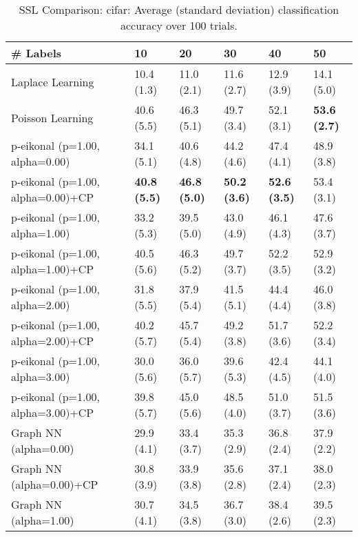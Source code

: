 \documentclass{article}
\begin{document}
\begin{table*}[t!]
\vspace{-3mm}
\caption{SSL Comparison: cifar: Average (standard deviation) classification accuracy over 100 trials.}
\vspace{-3mm}
\label{tab:SSL Comparison: cifar}
\vskip 0.15in
\begin{center}
\begin{small}
\begin{sc}
\begin{tabular}{llllll}
\toprule
\# Labels&\textbf{10}&\textbf{20}&\textbf{30}&\textbf{40}&\textbf{50}\\
\midrule
Laplace Learning&10.4 (1.3)      &11.0 (2.1)      &11.6 (2.7)      &12.9 (3.9)      &14.1 (5.0)      \\
Poisson Learning&40.6 (5.5)      &46.3 (5.1)      &49.7 (3.4)      &52.1 (3.1)      &{\bf 53.6 (2.7)}\\
p-eikonal (p=1.00, alpha=0.00)&34.1 (5.1)      &40.6 (4.8)      &44.2 (4.6)      &47.4 (4.1)      &48.9 (3.8)      \\
p-eikonal (p=1.00, alpha=0.00)+CP&{\bf 40.8 (5.5)}&{\bf 46.8 (5.0)}&{\bf 50.2 (3.6)}&{\bf 52.6 (3.5)}&53.4 (3.1)      \\
p-eikonal (p=1.00, alpha=1.00)&33.2 (5.3)      &39.5 (5.0)      &43.0 (4.9)      &46.1 (4.3)      &47.6 (3.7)      \\
p-eikonal (p=1.00, alpha=1.00)+CP&40.5 (5.6)      &46.3 (5.2)      &49.7 (3.7)      &52.2 (3.5)      &52.9 (3.2)      \\
p-eikonal (p=1.00, alpha=2.00)&31.8 (5.5)      &37.9 (5.4)      &41.5 (5.1)      &44.4 (4.4)      &46.0 (3.8)      \\
p-eikonal (p=1.00, alpha=2.00)+CP&40.2 (5.7)      &45.7 (5.4)      &49.2 (3.8)      &51.7 (3.6)      &52.2 (3.4)      \\
p-eikonal (p=1.00, alpha=3.00)&30.0 (5.6)      &36.0 (5.7)      &39.6 (5.3)      &42.4 (4.5)      &44.1 (4.0)      \\
p-eikonal (p=1.00, alpha=3.00)+CP&39.8 (5.7)      &45.0 (5.6)      &48.5 (4.0)      &51.0 (3.7)      &51.5 (3.6)      \\
Graph NN (alpha=0.00)&29.9 (4.1)      &33.4 (3.7)      &35.3 (2.9)      &36.8 (2.4)      &37.9 (2.2)      \\
Graph NN (alpha=0.00)+CP&30.8 (3.9)      &33.9 (3.8)      &35.6 (2.8)      &37.1 (2.4)      &38.0 (2.3)      \\
Graph NN (alpha=1.00)&30.7 (4.1)      &34.5 (3.8)      &36.7 (3.0)      &38.4 (2.6)      &39.5 (2.3)      \\

\end{tabular}
\end{sc}
\end{small}
\end{center}
\end{table*}
\end{document}
